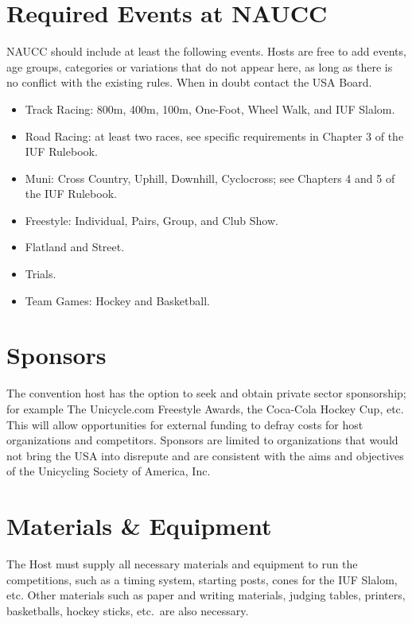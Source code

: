 \section{Required Events at NAUCC}
NAUCC should include at least the following events.
Hosts are free to add events, age groups, categories or variations that do not appear here, as long as there is no conflict with the existing rules.
When in doubt contact the USA Board.
\begin{itemize}
  \item Track Racing: 800m, 400m, 100m, One-Foot, Wheel Walk, and IUF Slalom.
  \item Road Racing: at least two races, see specific requirements in Chapter 3 of the IUF Rulebook.
   \item Muni: Cross Country, Uphill, Downhill, Cyclocross; see Chapters 4 and 5 of the IUF Rulebook.
   \item Freestyle: Individual, Pairs, Group, and Club Show.
   \item Flatland and Street.
   \item Trials.
  \item Team Games: Hockey and Basketball.
\end{itemize}

\section{Sponsors}

The convention host has the option to seek and obtain private sector sponsorship; for example The Unicycle.com Freestyle Awards, the Coca-Cola Hockey Cup, etc.
This will allow opportunities for external funding to defray costs for host organizations and competitors.
Sponsors are limited to organizations that would not bring the USA into disrepute and are consistent with the aims and objectives of the Unicycling Society of America, Inc.

\section{Materials \& Equipment}
The Host must supply all necessary materials and equipment to run the competitions, such as a timing system, starting posts, cones for the IUF Slalom, etc.
Other materials such as paper and writing materials, judging tables, printers, basketballs, hockey sticks, etc.\ are also necessary.

